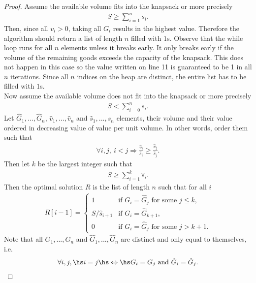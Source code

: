 \documentclass{article}
\begin{document}
\begin{proof}
	Assume the available volume fits into the knapsack or more precisely
	\begin{align*}
		S \geq \sum_{i=1}^n s_i.
	\end{align*}
	Then, since all $v_i>0$, taking all $G_i$ results in the highest value.
	Therefore the algorithm should return a list of length $n$ filled with
	$1$s. Observe that the while loop runs for all $n$ elements unless it
	breaks early. It only breaks early if the volume of the remaining goods
	exceeds the capacity of the knapsack. This does not happen in this case
	so the value written on line 11 is guaranteed to be 1 in all $n$
	iterations. Since all $n$ indices on the heap are distinct, the entire
	list has to be filled with $1$s.\\
	Now assume the available volume does not fit into the knapsack or more
	precisely
	\begin{align*}
		S < \sum_{i=0}^n s_i.
	\end{align*}
	Let $\hat G_1, ...,\hat G_n$, $\hat v_1, ...,\hat v_n$ and $\hat s_1, ...,\hat s_n$
	elements, their volume and their value ordered in decreasing value of value per unit
	volume. In other words, order them such that
	\begin{align}
		\label{iord}
		\forall i,j,\: i < j \Rightarrow \frac{\hat v_i}{\hat s_i}\geq \frac{\hat v_j}{\hat s_j}.
	\end{align}
	Then let $k$ be the largest integer such that
	\begin{align*}
		S \geq \sum_{i=1}^k \hat s_i.
	\end{align*}
	Then the optimal solution $R$ is the list of length $n$ such that for all $i$
	\begin{align}
		\label{optsol}
		R[i-1] = \begin{cases}
			1              & \text{if } G_i = \hat G_j \text{ for some } j \leq k, \\
			S/\hat s_{i+1} & \text{if } G_i = \hat G_{k+1},                        \\
			0              & \text{if } G_i = \hat G_j \text{ for some } j > k+1.
		\end{cases}
	\end{align}
	Note that all $G_1, ..., G_n$ and $\hat G_1, ..., \hat G_n$ are distinct
	and only equal to themselves, i.e.
	\begin{align*}
		\forall i,j,\hs i=j \hs \Leftrightarrow \hs G_i = G_j \text{ and } \hat G_i = \hat G_j.
	\end{align*}

\end{proof}
\end{document}
